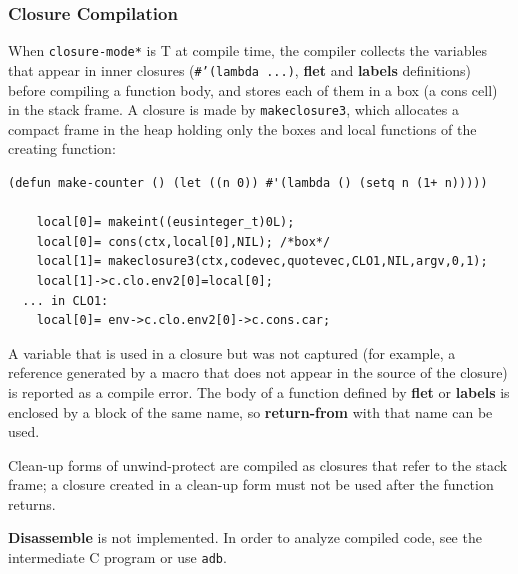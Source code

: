 \subsubsection{Closure Compilation}

When {\tt *closure-mode*} is T at compile time, the compiler collects the
variables that appear in inner closures ({\tt \#'(lambda ...)}, {\bf flet}
and {\bf labels} definitions) before compiling a function body, and stores
each of them in a box (a cons cell) in the stack frame.  A closure is made by
{\tt makeclosure3}, which allocates a compact frame in the heap holding only
the boxes and local functions of the creating function:
\begin{verbatim}
(defun make-counter () (let ((n 0)) #'(lambda () (setq n (1+ n)))))

	local[0]= makeint((eusinteger_t)0L);
	local[0]= cons(ctx,local[0],NIL); /*box*/
	local[1]= makeclosure3(ctx,codevec,quotevec,CLO1,NIL,argv,0,1);
	local[1]->c.clo.env2[0]=local[0];
  ... in CLO1:
	local[0]= env->c.clo.env2[0]->c.cons.car;
\end{verbatim}
A variable that is used in a closure but was not captured (for example, a
reference generated by a macro that does not appear in the source of the
closure) is reported as a compile error.  The body of a function defined by
{\bf flet} or {\bf labels} is enclosed by a block of the same name, so
{\bf return-from} with that name can be used.

Clean-up forms of unwind-protect are compiled as closures that refer to the
stack frame; a closure created in a clean-up form must not be used after
the function returns.

{\bf Disassemble} is not implemented.
In order to analyze compiled code, see the intermediate C program
or use {\tt adb}.

